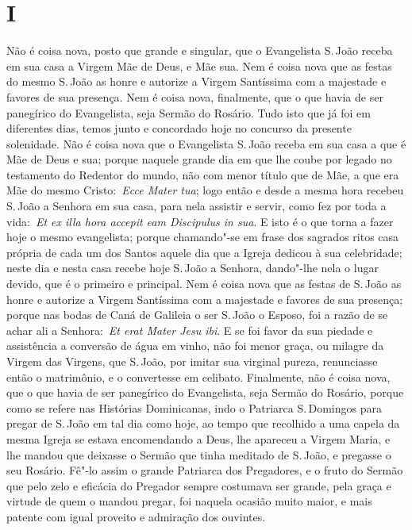 \section*{I}

\noindent{}Não é coisa nova, posto que grande e singular, que o
Evangelista S.\,João receba em sua casa a Virgem Mãe de Deus, e Mãe sua.
Nem é coisa nova que as festas do mesmo S.\,João as honre e autorize a
Virgem Santíssima com a majestade e favores de sua presença. Nem é coisa
nova, finalmente, que o que havia de ser panegírico do Evangelista, seja
Sermão do Rosário. Tudo isto que já foi em diferentes dias, temos junto
e concordado hoje no concurso da presente solenidade. Não é coisa nova
que o Evangelista S.\,João receba em sua casa a que é Mãe de Deus e sua;
porque naquele grande dia em que lhe coube por legado no testamento do
Redentor do mundo, não com menor título que de Mãe, a que era Mãe do
mesmo Cristo:~\emph{Ecce Mater tua}; logo então e desde
a mesma hora recebeu S.\,João a Senhora em sua casa, para nela assistir e
servir, como fez por toda a vida:~\emph{Et ex illa hora accepit eam
Discipulus in sua}. E isto é o que torna a fazer hoje o
mesmo evangelista; porque chamando"-se em frase dos sagrados ritos casa
própria de cada um dos Santos aquele dia que a Igreja dedicou à sua
celebridade; neste dia e nesta casa recebe hoje S.\,João a Senhora,
dando"-lhe nela o lugar devido, que é o primeiro e principal. Nem é coisa
nova que as festas de S.\,João as honre e autorize a Virgem Santíssima
com a majestade e favores de sua presença; porque nas bodas de Caná de
Galileia o ser S.\,João o Esposo, foi a razão de se achar ali a
Senhora:~\emph{Et erat Mater Jesu ibi}. E se foi favor
da sua piedade e assistência a conversão de água em vinho, não foi menor
graça, ou milagre da Virgem das Virgens, que S.\,João, por imitar sua
virginal pureza, renunciasse então o matrimônio, e o convertesse em
celibato. Finalmente, não é coisa nova, que o que havia de ser
panegírico do Evangelista, seja Sermão do Rosário, porque como se refere
nas Histórias Dominicanas, indo o Patriarca S.\,Domingos para pregar de
S.\,João em tal dia como hoje, ao tempo que recolhido a uma capela da
mesma Igreja se estava encomendando a Deus, lhe apareceu a Virgem Maria,
e lhe mandou que deixasse o Sermão que tinha meditado de S.\,João, e
pregasse o seu Rosário. Fê"-lo assim o grande Patriarca dos Pregadores, e
o fruto do Sermão que pelo zelo e eficácia do Pregador sempre costumava
ser grande, pela graça e virtude de quem o mandou pregar, foi naquela
ocasião muito maior, e mais patente com igual proveito e admiração dos
ouvintes.


